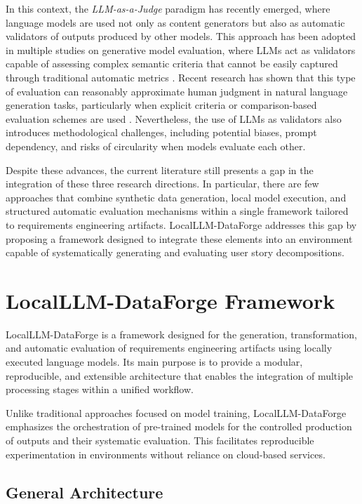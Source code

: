 \documentclass[pdflatex,sn-mathphys-num]{sn-jnl}%
\theoremstyle{thmstyleone}%
\theoremstyle{thmstyletwo}%
\theoremstyle{thmstylethree}%
\begin{document}
In this context, the \textit{LLM-as-a-Judge} paradigm has recently emerged, where language models are used not only as content generators but also as automatic validators of outputs produced by other models. This approach has been adopted in multiple studies on generative model evaluation, where LLMs act as validators capable of assessing complex semantic criteria that cannot be easily captured through traditional automatic metrics \cite{daly2025}. Recent research has shown that this type of evaluation can reasonably approximate human judgment in natural language generation tasks, particularly when explicit criteria or comparison-based evaluation schemes are used \cite{eigler2026}. Nevertheless, the use of LLMs as validators also introduces methodological challenges, including potential biases, prompt dependency, and risks of circularity when models evaluate each other.

Despite these advances, the current literature still presents a gap in the integration of these three research directions. In particular, there are few approaches that combine synthetic data generation, local model execution, and structured automatic evaluation mechanisms within a single framework tailored to requirements engineering artifacts. LocalLLM-DataForge addresses this gap by proposing a framework designed to integrate these elements into an environment capable of systematically generating and evaluating user story decompositions.

\section{LocalLLM-DataForge Framework}\label{sec3}

LocalLLM-DataForge is a framework designed for the generation, transformation, and automatic evaluation of requirements engineering artifacts using locally executed language models. Its main purpose is to provide a modular, reproducible, and extensible architecture that enables the integration of multiple processing stages within a unified workflow.

Unlike traditional approaches focused on model training, LocalLLM-DataForge emphasizes the orchestration of pre-trained models for the controlled production of outputs and their systematic evaluation. This facilitates reproducible experimentation in environments without reliance on cloud-based services.

\subsection{General Architecture}
\end{document}
